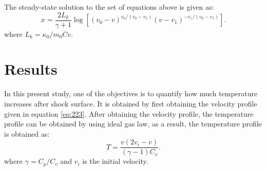 \documentclass[12pt]{report}
\begin{document}
The steady-state solution to the set of equations\cite{Johnson} above is given as:
\begin{equation}
\label{eq:223}
x=\frac{2 L_k}{\gamma+1}\log \left [(v_0 -v)^{v_0/(v_0-v_1)}(v-v_1)^{-v_1/(v_0-v_1)}  \right ].
\end{equation}
where $L_k= \kappa_0/m_0 Cv $.
\chapter{Results}
In this present study, one of the objectives is to quantify how much temperature increases after shock surface.  It is obtained by first obtaining the velocity profile given in equation \ref{eq:223}. After obtaining the velocity profile, the temperature profile can be obtained by using ideal gas law, as a result, the temperature profile is obtained as:
\begin{equation}
\label{eq:30}
T=\frac{v(2v_i-v)}{(\gamma-1)C_v}.
\end{equation}
where $\gamma=C_p/C_v$ and $v_i$ is the initial velocity.  
\end{document}
